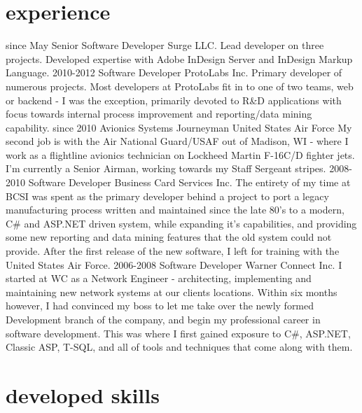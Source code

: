 \documentclass{schoens-cv}
\begin{document}
\section{experience}

\begin{entrylist}
	\entry
		{since May}
		{Senior Software Developer}
		{Surge LLC.}
		{Lead developer on three projects. Developed expertise with Adobe InDesign Server and %
		 InDesign Markup Language.}
	\entry
		{2010-2012}
		{Software Developer}
		{ProtoLabs Inc.}
		{Primary developer of numerous projects. Most developers at ProtoLabs fit in to one of two teams, %
		 web or backend - I was the exception, primarily devoted to R\&D applications with focus towards %
		 internal process improvement and reporting/data mining capability.}
	\entry
		{since 2010}
		{Avionics Systems Journeyman}
		{United States Air Force}
		{My second job is with the Air National Guard/USAF out of Madison, WI - where I work as a flightline %
		 avionics technician on Lockheed Martin F-16C/D fighter jets. I'm currently a Senior Airman, working %
		 towards my Staff Sergeant stripes.}
	\entry
		{2008-2010}
		{Software Developer}
		{Business Card Services Inc.}
		{The entirety of my time at BCSI was spent as the primary developer behind a project to port a %
		 legacy manufacturing process written and maintained since the late 80's to a modern, C\# and ASP.NET %
		 driven system, while expanding it's capabilities, and providing some new reporting and data mining %
		 features that the old system could not provide. After the first release of the new software, I left %
		 for training with the United States Air Force.}
	\entry
		{2006-2008}
		{Software Developer}
		{Warner Connect Inc.}
		{I started at WC as a Network Engineer - architecting, implementing and maintaining new network %
		 systems at our clients locations. Within six months however, I had convinced my boss to let me take %
		 over the newly formed Development branch of the company, and begin my professional career in software%
		  development. This was where I first gained exposure to C\#, ASP.NET, Classic ASP, T-SQL, and all of %
		 tools and techniques that come along with them.}
\end{entrylist}

\section{developed skills}
\end{document}
